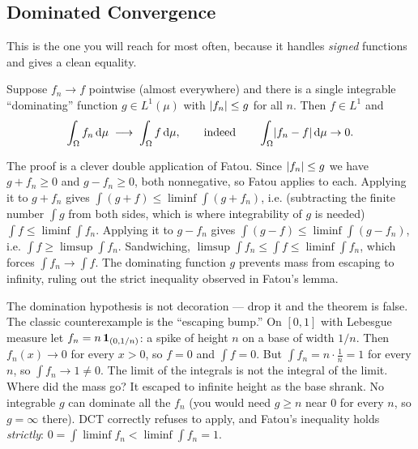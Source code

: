 \subsection{Dominated Convergence}

This is the one you will reach for most often, because it handles
\emph{signed} functions and gives a clean equality.

\begin{theorem}
\label{ch37:thm-dct}
Suppose $f_n\to f$ pointwise (almost everywhere) and there is a single
integrable ``dominating'' function $g\in L^1(\mu)$ with $\lvert f_n\rvert\le g$ for all
$n$. Then $f\in L^1$ and
\[
  \int_\Omega f_n\,\mathrm{d}\mu \;\longrightarrow\; \int_\Omega f\,\mathrm{d}\mu,
  \qquad\text{indeed}\qquad
  \int_\Omega \lvert f_n - f\rvert\,\mathrm{d}\mu \to 0 .
\]
\end{theorem}

\begin{whybox}
The proof is a clever double application of Fatou. Since $\lvert f_n\rvert\le g$ we have
$g+f_n\ge 0$ and $g-f_n\ge 0$, both nonnegative, so Fatou applies to each.
Applying it to $g+f_n$ gives $\int(g+f)\le\liminf\int(g+f_n)$, i.e. (subtracting the
finite number $\int g$ from both sides, which is where integrability of $g$ is needed)
$\int f \le \liminf\int f_n$. Applying it to $g-f_n$ gives $\int(g-f)\le\liminf\int(g-f_n)$,
i.e. $\int f \ge \limsup\int f_n$. Sandwiching, $\limsup\int f_n \le \int f \le
\liminf\int f_n$, which forces $\int f_n\to\int f$. The dominating function $g$
prevents mass from escaping to infinity, ruling out the strict inequality
observed in Fatou's lemma.
\end{whybox}

\begin{trapbox}
The domination hypothesis is not decoration --- drop it and the theorem is
false. The classic counterexample is the ``escaping bump.'' On $[0,1]$ with
Lebesgue measure let $f_n = n\,\mathbf{1}_{(0,1/n)}$: a spike of height $n$ on a base
of width $1/n$. Then $f_n(x)\to 0$ for every $x>0$, so $f=0$ and $\int f = 0$.
But $\int f_n = n\cdot\frac1n = 1$ for every $n$, so $\int f_n \to 1 \ne 0$. The
limit of the integrals is not the integral of the limit. Where did the mass go?
It escaped to infinite height as the base shrank. No integrable $g$ can dominate
all the $f_n$ (you would need $g\ge n$ near $0$ for every $n$, so $g=\infty$
there). DCT correctly refuses to apply, and Fatou's inequality holds
\emph{strictly}: $0 = \int\liminf f_n < \liminf\int f_n = 1$.
\end{trapbox}

